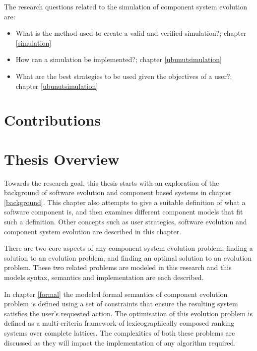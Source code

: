 The research questions related to the simulation of component system evolution are: 
\begin{itemize}
	\item What is the method used to create a valid and verified simulation?;  chapter \ref{simulation}
	\item How can a simulation be implemented?;  chapter \ref{ubunutsimulation}
	\item What are the best strategies to be used given the objectives of a user?;  chapter \ref{ubunutsimulation}
\end{itemize}

\section{Contributions}

\section{Thesis Overview}
Towards the research goal, this thesis starts with an exploration of the background of software evolution and component based systems in chapter \ref{background}.
This chapter also attempts to give a suitable definition of what a software component is, and then examines different component models that fit such a definition.
Other concepts such as user strategies, software evolution and component system evolution are described in this chapter.

There are two core aspects of any component system evolution problem; 
finding a solution to an evolution problem, and finding an optimal solution to an evolution problem.
These two related problems are modeled in this research and this models syntax, semantics and implementation are each described.

In chapter \ref{formal} the modeled formal semantics of component evolution problem is defined using a set of constraints that ensure the resulting system satisfies the user's requested action.
The optimisation of this evolution problem is defined as a multi-criteria framework of lexicographically composed ranking systems over complete lattices.
The complexities of both these problems are discussed as they will impact the implementation of any algorithm required.

